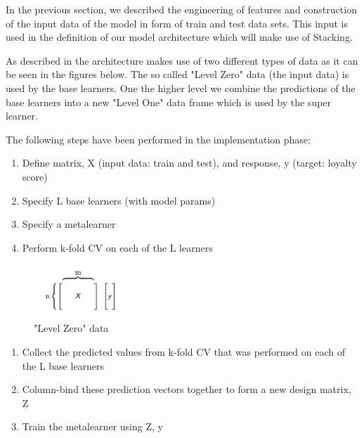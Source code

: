 \documentclass{article}
\begin{document}

In the previous section, we described the engineering of features and construction of the input data of the model in form of train and test data sets. This input is used in the definition of our model architecture which will make use of Stacking. 

As described in \cite{h2olevel} the architecture makes use of two different types of data as it can be seen in the figures below. The so called "Level Zero" data (the input data) is used by the base learners. One the higher level we combine the predictions of the base learners into a new "Level One" data frame which is used by the super learner.

The following steps have been performed in the implementation phase:
\begin{enumerate}
    \item Define matrix, X (input data: train and test), and response, y (target: loyalty score)
    \item Specify L base learners (with model params)
    \item Specify a metalearner
    \item Perform k-fold CV on each of the L learners
\end{enumerate}

\begin{figure}[h]
  \centering
  \includegraphics[width=100pt]{level_zero_data}
  \caption{"Level Zero" data}
  \label{fig:level_zero_data}
\end{figure}

\begin{enumerate}
    \item Collect the predicted values from k-fold CV that was
performed on each of the L base learners
    \item Column-bind these prediction vectors together to
form a new design matrix, Z
    \item Train the metalearner using Z, y
\end{enumerate}
\end{document}
